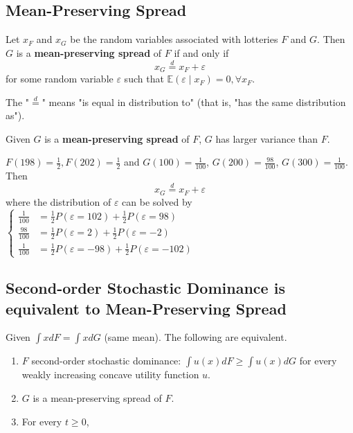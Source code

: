 \documentclass[11pt]{elegantbook}
\begin{document}
\subsection{Mean-Preserving Spread}
\begin{definition}
    \normalfont
    Let $x_F$ and $x_G$ be the random variables associated with lotteries $F$ and $G$. Then $G$ is a \textbf{mean-preserving spread} of $F$ if and only if $$x_G \stackrel{d}{=} x_F+\varepsilon$$
    for some random variable $\varepsilon$ such that $\mathbb{E}(\varepsilon\mid x_F)=0,\forall x_F$.
\end{definition}
The "$\stackrel{d}{=}$" means "is equal in distribution to" (that is, "has the same distribution as").

\begin{note}
    Given $G$ is a \textbf{mean-preserving spread} of $F$, $G$ has larger variance than $F$.
\end{note}

\begin{example}
    $F(198)=\frac{1}{2}, F(202)=\frac{1}{2}$ and $G(100)=\frac{1}{100}$, $G(200)=\frac{98}{100}$, $G(300)=\frac{1}{100}$. Then $$x_G \stackrel{d}{=} x_F+\varepsilon$$
    where the distribution of $\varepsilon$ can be solved by $\left\{\begin{matrix}
        \frac{1}{100}&=\frac{1}{2}P(\varepsilon=102)+\frac{1}{2}P(\varepsilon=98)\\
        \frac{98}{100}&=\frac{1}{2}P(\varepsilon=2)+\frac{1}{2}P(\varepsilon=-2)\\
        \frac{1}{100}&=\frac{1}{2}P(\varepsilon=-98)+\frac{1}{2}P(\varepsilon=-102)
    \end{matrix}\right.$
\end{example}


\subsection{Second-order Stochastic Dominance is equivalent to Mean-Preserving Spread}
\begin{theorem}
    Given $\int x dF=\int x dG$ (same mean). The following are equivalent.
    \begin{enumerate}
        \item $F$ second-order stochastic dominance: $\int u (x) dF \geq \int u(x) dG$  for every weakly increasing concave utility function $u$.
        \item $G$ is a mean-preserving spread of $F$.
        \item For every $t\geq 0$, 
    \end{enumerate}
\end{theorem}
\end{document}
